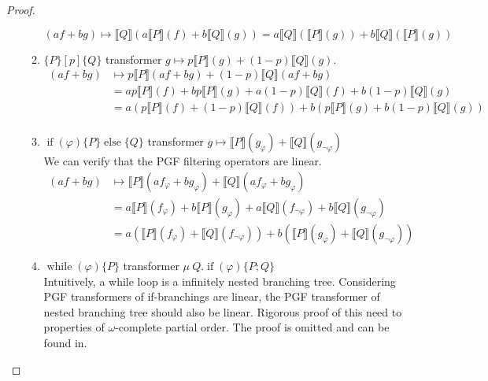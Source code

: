 \documentclass[a4paper]{article}
\renewcommand{\S}[1]{ \llbracket #1 \rrbracket }
\begin{document}
\begin{proof}
\begin{enumerate}
\begin{enumerate}
			            \[
				            (af+bg) \mapsto \S{Q}(a\S{P}(f) + b\S{Q}(g)) = a\S{Q}(\S{P}(g)) + b \S{Q}(\S{P}(g))
			            \]
			      \item \(\{P\}[p]\{Q\}\) transformer \(g\mapsto p\S{P}(g) + (1-p)\S{Q}(g)\).
			            \begin{align*}
				            (af+bg) & \mapsto  p\S{P}(af+bg) + (1-p)\S{Q}(af+bg)                                             \\
				                    & = ap\S{P}(f) + bp\S{P}(g) + a(1-p)\S{Q}(f) + b(1-p)\S{Q}(g)                            \\
				                    & = a\left(p\S{P}(f) + (1-p)\S{Q}(f)\right) + b\left( p\S{P}(g) + b(1-p)\S{Q}(g) \right) \\
			            \end{align*}
			      \item \(\operatorname{if}(\varphi)\{P\}\operatorname{else}\{Q\}\) transformer \(g\mapsto \S{P}(g_{\varphi}) + \S{Q}(g_{\lnot\varphi})\)\\
			            We can verify that the PGF filtering operators are linear.
			            \begin{align*}
				            (af+bg) & \mapsto \S{P}(a f_{\varphi} + b g_{\varphi}) + \S{Q}(a f_{\varphi} + b g_{\varphi})                                           \\
				                    & = a\S{P}(f_{\varphi}) + b\S{P}(g_{\varphi})  + a\S{Q}(f_{\lnot\varphi}) + b\S{Q}(g_{\lnot\varphi})                            \\
				                    & = a\left( \S{P}(f_{\varphi}) + \S{Q}(f_{\lnot\varphi}) \right) + b\left( \S{P}(g_{\varphi}) + \S{Q}(g_{\lnot\varphi}) \right)
			            \end{align*}
			      \item \(\operatorname{while}(\varphi)\{P\}\) transformer \(\mu\ Q . \operatorname{if}(\varphi)\{P;Q\}\)\\
			            Intuitively, a while loop is a infinitely nested branching tree.
			            Considering PGF transformers of if-branchings are linear, the PGF transformer of nested branching tree should also be linear.
			            Rigorous proof of this need to properties of \(\omega\)-complete partial order. The proof is omitted and can be found in\cite{cav-extended}.
		      \end{enumerate}
	\end{enumerate}
\end{proof}
\end{document}

